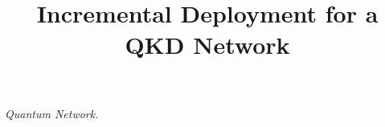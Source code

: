 \documentclass[10pt,conference,compsocconf,letterpaper]{IEEEtran}
\begin{document}
%


\title{Incremental Deployment for a QKD Network}


\author{ }



\maketitle

\begin{abstract}

\end{abstract}

\begin{IEEEkeywords}
\emph{Quantum Network.}
\end{IEEEkeywords}

\IEEEpeerreviewmaketitle
\end{document}
